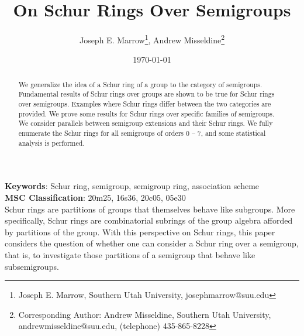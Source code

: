 \documentclass{article}
\title{On Schur Rings Over Semigroups}
\author{Joseph E. Marrow\footnote{Joseph E. Marrow, Southern Utah University, josephmarrow@suu.edu},  Andrew Misseldine\footnote{Corresponding Author: Andrew Misseldine, Southern Utah University, andrewmisseldine@suu.edu, (telephone) 435-865-8228}}
\date{\today}
\theoremstyle{plain}
\theoremstyle{definition}
\begin{document}
\maketitle

\begin{abstract}
We generalize the idea of a Schur ring of a group to the category of semigroups. Fundamental results of Schur rings over groups are shown to be true for Schur rings over semigroups. Examples where Schur rings differ between the two categories are provided. We prove some results for Schur rings over specific families of semigroups. We consider parallels between  semigroup extensions and their Schur rings. We fully enumerate the Schur rings for all semigroups of orders 0 -- 7, and some statistical analysis is performed. 
\end{abstract}

\textbf{Keywords}:
Schur ring, semigroup, semigroup ring, association scheme\\

\textbf{MSC Classification}:
20m25, %
16s36, %
20c05, %
05e30 %
\\

Schur rings are partitions of groups that themselves behave like subgroups. More specifically, Schur rings are combinatorial subrings of the group algebra afforded by partitions of the group. With this perspective on Schur rings, this paper considers the question of whether one can consider a Schur ring over a semigroup, that is, to investigate those partitions of a semigroup that behave like subsemigroups. 
\end{document}
